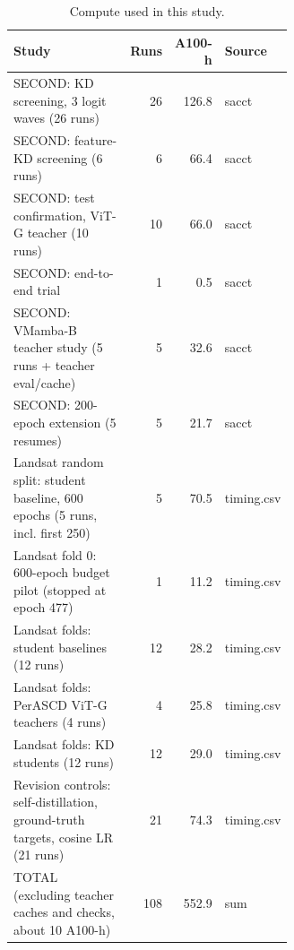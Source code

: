 \begin{table}[!t]
\centering
\footnotesize
\caption{Compute used in this study.}
\label{tab:s-compute}
\begin{tabular}{p{0.62\linewidth}rrl}
\toprule
Study & Runs & A100-h & Source \\
\midrule
SECOND: KD screening, 3 logit waves (26 runs) & 26 & 126.8 & sacct \\
SECOND: feature-KD screening (6 runs) & 6 & 66.4 & sacct \\
SECOND: test confirmation, ViT-G teacher (10 runs) & 10 & 66.0 & sacct \\
SECOND: end-to-end trial & 1 & 0.5 & sacct \\
SECOND: VMamba-B teacher study (5 runs + teacher eval/cache) & 5 & 32.6 & sacct \\
SECOND: 200-epoch extension (5 resumes) & 5 & 21.7 & sacct \\
Landsat random split: student baseline, 600 epochs (5 runs, incl. first 250) & 5 & 70.5 & timing.csv \\
Landsat fold 0: 600-epoch budget pilot (stopped at epoch 477) & 1 & 11.2 & timing.csv \\
Landsat folds: student baselines (12 runs) & 12 & 28.2 & timing.csv \\
Landsat folds: PerASCD ViT-G teachers (4 runs) & 4 & 25.8 & timing.csv \\
Landsat folds: KD students (12 runs) & 12 & 29.0 & timing.csv \\
Revision controls: self-distillation, ground-truth targets, cosine LR (21 runs) & 21 & 74.3 & timing.csv \\
TOTAL (excluding teacher caches and checks, about 10 A100-h) & 108 & 552.9 & sum \\
\bottomrule
\end{tabular}
\end{table}
